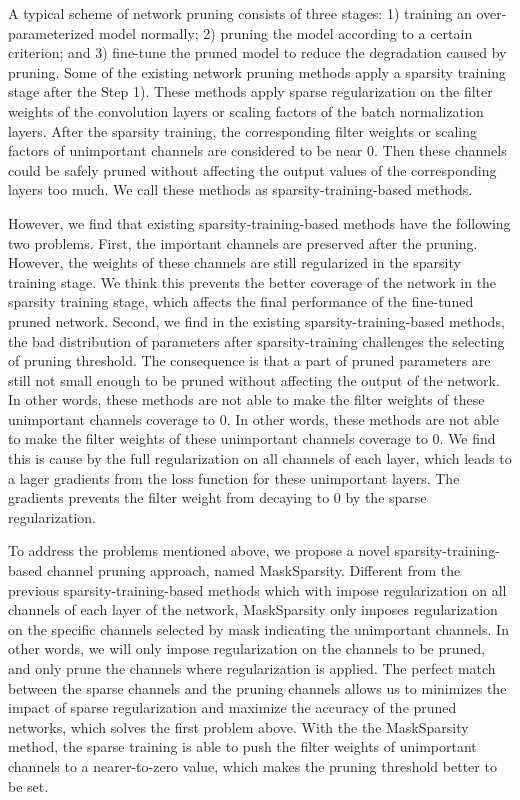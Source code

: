 \documentclass[review]{cvpr}
\begin{document}
A typical scheme of network pruning consists of three stages: 1) training an over-parameterized model normally; 2) pruning the model according to a certain criterion; and 3) fine-tune the pruned model to reduce the degradation caused by pruning. Some of the existing network pruning methods apply a sparsity training stage after the Step 1). These methods apply sparse regularization on the filter weights of the convolution layers \cite{alvarez2016learning,wen2016learning} or scaling factors \cite{huang2018data,liu2017learning} of the batch normalization layers. After the sparsity training, the corresponding filter weights or scaling factors of unimportant channels are considered to be near 0. Then these channels could be safely pruned without affecting the output values of the corresponding layers too much. We call these methods as sparsity-training-based methods. 
 
However, we find that existing sparsity-training-based methods have the following two problems. First, the important channels are preserved after the pruning. However, the weights of these channels are still regularized in the sparsity training stage. We think this prevents the better coverage of the network in the sparsity training stage, which affects the final performance of the fine-tuned pruned network. Second, we find in the existing sparsity-training-based methods, the bad distribution of parameters after sparsity-training challenges the selecting of pruning threshold. The consequence is that a part of pruned parameters are still not small enough to be pruned without affecting the output of the network. In other words, these methods are not able to make the filter weights of these unimportant channels coverage to 0. In other words, these methods are not able to make the filter weights of these unimportant channels coverage to 0. We find this is cause by the full regularization on all channels of each layer, which leads to a lager gradients from the loss function for these unimportant layers. The gradients prevents the filter weight from decaying to 0 by the sparse regularization.


To address the problems mentioned above, we propose a novel sparsity-training-based channel pruning approach, named MaskSparsity. Different from the previous sparsity-training-based methods which with impose regularization on all channels of each layer of the network, MaskSparsity only imposes regularization on the specific channels selected by mask indicating the unimportant channels. In other words, we will only impose regularization on the channels to be pruned, and only prune the channels where regularization is applied. The perfect match between the sparse channels and the pruning channels allows us to minimizes the impact of sparse regularization and maximize the accuracy of the pruned networks, which solves the first problem above. With the the MaskSparsity method, the sparse training is able to push the filter weights of unimportant channels to a nearer-to-zero value, which makes the pruning threshold better to be set.
\end{document}
